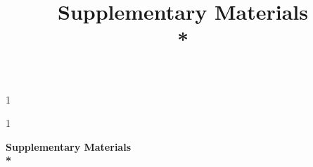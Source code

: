 \documentclass[letter,12pt]{article}
\newcommand{\blind}{1}
\begin{document}
\doublespacing



\blind
{
\title{
	\bf
	\Large
	Supplementary Materials
	\\*
    \large
    \georddtitle
}
\author{\georddauthor}
\maketitle
} \fi

\blind
{
  \bigskip
  \bigskip
  \bigskip
  \begin{center}
	\bf 
	\LARGE
	Supplementary Materials
	\\*
	\large
	\georddtitle
  \end{center}
  \medskip
} \fi





\end{document}
